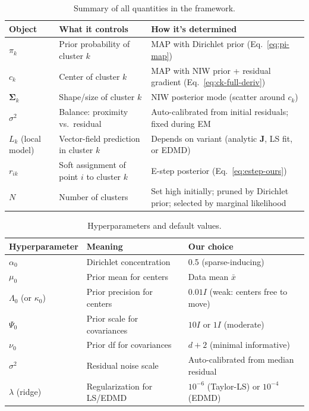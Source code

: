 \documentclass[11pt]{article}
\theoremstyle{definition}
\theoremstyle{plain}
\theoremstyle{remark}
\newcommand{\Sv}{\boldsymbol{\Sigma}}
\newcommand{\Jv}{\boldsymbol{J}}
\begin{document}
\begin{table}[h]
\centering\small
\begin{tabular}{p{3.5cm}p{4cm}p{5cm}}
\toprule
\textbf{Object} & \textbf{What it controls} & \textbf{How it's determined} \\
\midrule
$\pi_k$ & Prior probability of cluster $k$ & MAP with Dirichlet prior (Eq.~\ref{eq:pi-map}) \\
$c_k$ & Center of cluster $k$ & MAP with NIW prior + residual gradient (Eq.~\ref{eq:ck-full-deriv}) \\
$\Sv_k$ & Shape/size of cluster $k$ & NIW posterior mode (scatter around $c_k$) \\
$\sigma^2$ & Balance: proximity vs.\ residual & Auto-calibrated from initial residuals; fixed during EM \\
$L_k$ (local model) & Vector-field prediction in cluster $k$ & Depends on variant (analytic $\Jv$, LS fit, or EDMD) \\
$r_{ik}$ & Soft assignment of point $i$ to cluster $k$ & E-step posterior (Eq.~\ref{eq:estep-ours}) \\
$N$ & Number of clusters & Set high initially; pruned by Dirichlet prior; selected by marginal likelihood \\
\bottomrule
\end{tabular}
\caption{Summary of all quantities in the framework.}
\end{table}

\begin{table}[h]
\centering\small
\begin{tabular}{p{3cm}p{4.5cm}p{4.5cm}}
\toprule
\textbf{Hyperparameter} & \textbf{Meaning} & \textbf{Our choice} \\
\midrule
$\alpha_0$ & Dirichlet concentration & 0.5 (sparse-inducing) \\
$\mu_0$ & Prior mean for centers & Data mean $\bar{x}$ \\
$\Lambda_0$ (or $\kappa_0$) & Prior precision for centers & $0.01 I$ (weak: centers free to move) \\
$\Psi_0$ & Prior scale for covariances & $10 I$ or $1 I$ (moderate) \\
$\nu_0$ & Prior df for covariances & $d+2$ (minimal informative) \\
$\sigma^2$ & Residual noise scale & Auto-calibrated from median residual \\
$\lambda$ (ridge) & Regularization for LS/EDMD & $10^{-6}$ (Taylor-LS) or $10^{-4}$ (EDMD) \\
\bottomrule
\end{tabular}
\caption{Hyperparameters and default values.}
\end{table}
\end{document}
